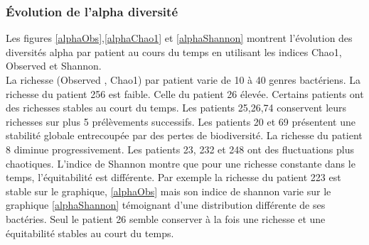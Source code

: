 \documentclass[12pt,a4paper]{article}
\begin{document}
\subsubsection{Évolution de l'alpha diversité}
Les figures \ref{alphaObs},\ref{alphaChao1} et \ref{alphaShannon} montrent l’évolution des diversités alpha par patient au cours du temps en utilisant les indices Chao1, Observed et Shannon. \\
La richesse (Observed , Chao1) par patient varie de 10 à 40 genres bactériens. La richesse du patient 256 est faible. Celle du patient 26 élevée.
Certains patients ont des richesses stables au court du temps. Les patients 25,26,74 conservent leurs richesses sur plus 5 prélèvements successifs. Les patients 20 et 69 présentent une stabilité globale entrecoupée par des pertes de biodiversité. La richesse du patient 8 diminue progressivement. Les patients 23, 232 et 248 ont des fluctuations plus chaotiques.
L'indice de Shannon montre que pour une richesse constante dans le temps, l'équitabilité est différente. Par exemple la richesse du patient 223 est stable sur le graphique, \ref{alphaObs} mais son indice de shannon varie sur le graphique \ref{alphaShannon} témoignant d'une distribution différente de ses bactéries. Seul le patient 26 semble conserver à la fois une richesse et une équitabilité stables au court du temps.
\end{document}
